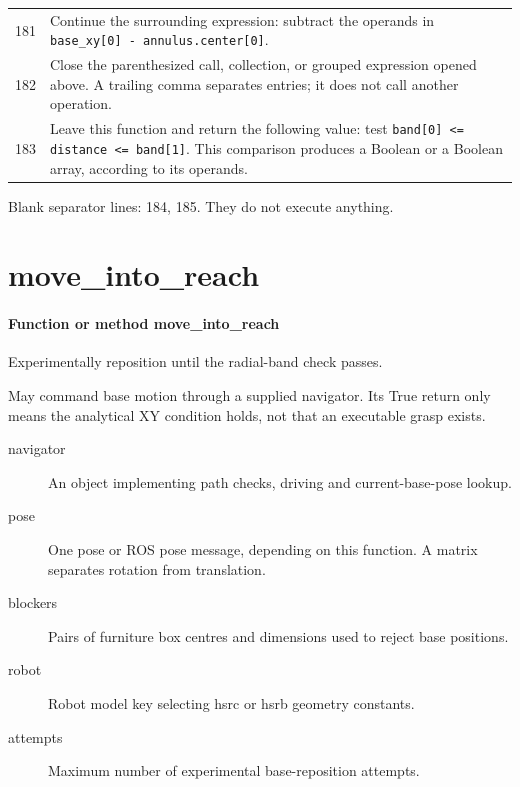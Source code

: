 \documentclass[11pt,a4paper]{book}
\begin{document}
\begin{longtable}{r p{}}
181 & Continue the surrounding expression: subtract the operands in \texttt{base\_xy[0] - annulus.center[0]}. \\

182 & Close the parenthesized call, collection, or grouped expression opened above. A trailing comma separates entries; it does not call another operation. \\

183 & Leave this function and return the following value: test \texttt{band[0] <= distance <= band[1]}. This comparison produces a Boolean or a Boolean array, according to its operands. \\

\end{longtable}

Blank separator lines: 184, 185. They do not execute anything.

\section{move\_into\_reach}

\paragraph{Function or method move\_into\_reach}
Experimentally reposition until the radial-band check passes.

May command base motion through a supplied navigator. Its True return only means the analytical XY condition holds, not that an executable grasp exists.

\begin{description}
\item[navigator] An object implementing path checks, driving and current-base-pose lookup.
\item[pose] One pose or ROS pose message, depending on this function. A matrix separates rotation from translation.
\item[blockers] Pairs of furniture box centres and dimensions used to reject base positions.
\item[robot] Robot model key selecting hsrc or hsrb geometry constants.
\item[attempts] Maximum number of experimental base-reposition attempts.
\end{description}
\end{document}
